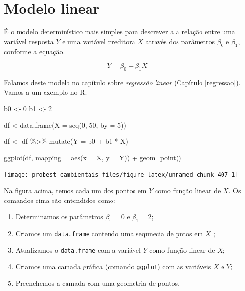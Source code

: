\documentclass[
]{book}
\newenvironment{Shaded}{\begin{snugshade}}{\end{snugshade}}
\newcommand{\AttributeTok}[1]{\textcolor[rgb]{0.77,0.63,0.00}{#1}}
\newcommand{\DecValTok}[1]{\textcolor[rgb]{0.00,0.00,0.81}{#1}}
\newcommand{\FunctionTok}[1]{\textcolor[rgb]{0.00,0.00,0.00}{#1}}
\newcommand{\NormalTok}[1]{#1}
\newcommand{\OtherTok}[1]{\textcolor[rgb]{0.56,0.35,0.01}{#1}}
\newcommand{\SpecialCharTok}[1]{\textcolor[rgb]{0.00,0.00,0.00}{#1}}
\begin{document}
\hypertarget{modelo-linear}{%
\section{Modelo linear}\label{modelo-linear}}

É o modelo determinístico mais simples para descrever a a relação entre uma variável resposta \(Y\) e uma variável preditora \(X\) através dos parâmetros \(\beta_0\) e \(\beta_1\), conforme a equação.

\[Y = \beta_0 + \beta_1X\]

Falamos deste modelo no capítulo sobre \emph{regressão linear} (Capítulo \ref{regressao}).
Vamos a um exemplo no R.

\begin{Shaded}
\begin{Highlighting}[]
\NormalTok{b0 }\OtherTok{\textless{}{-}} \DecValTok{0}
\NormalTok{b1 }\OtherTok{\textless{}{-}} \DecValTok{2}

\NormalTok{df }\OtherTok{\textless{}{-}}\FunctionTok{data.frame}\NormalTok{(}\AttributeTok{X =} \FunctionTok{seq}\NormalTok{(}\DecValTok{0}\NormalTok{, }\DecValTok{50}\NormalTok{, }\AttributeTok{by =} \DecValTok{5}\NormalTok{))}

\NormalTok{df }\OtherTok{\textless{}{-}}\NormalTok{ df }\SpecialCharTok{\%\textgreater{}\%} \FunctionTok{mutate}\NormalTok{(}\AttributeTok{Y =}\NormalTok{ b0 }\SpecialCharTok{+}\NormalTok{ b1 }\SpecialCharTok{*}\NormalTok{ X)}

\FunctionTok{ggplot}\NormalTok{(df, }\AttributeTok{mapping =} \FunctionTok{aes}\NormalTok{(}\AttributeTok{x =}\NormalTok{ X, }\AttributeTok{y =}\NormalTok{ Y)) }\SpecialCharTok{+}
  \FunctionTok{geom\_point}\NormalTok{()}
\end{Highlighting}
\end{Shaded}

\begin{center}\texttt{[image: probest-cambientais\_files/figure-latex/unnamed-chunk-407-1]} \end{center}

Na figura acima, temos cada um dos pontos em \(Y\) como função linear de \(X\). Os comandos cima são entendidos como:

\begin{enumerate}
\def\labelenumi{\arabic{enumi}.}
\item
  Determinamos os parâmetros \(\beta_0 = 0\) e \(\beta_1 = 2\);
\item
  Criamos um \texttt{data.frame} contendo uma sequnecia de pntos em \(X\) ;
\item
  Atualizamos o \texttt{data.frame} com a variável \(Y\) como função linear de \(X\);
\item
  Criamos uma camada gráfica (comando \texttt{ggplot}) com as variáveis \(X\) e \(Y\);
\item
  Preenchemos a camada com uma geometria de pontos.
\end{enumerate}
\end{document}
